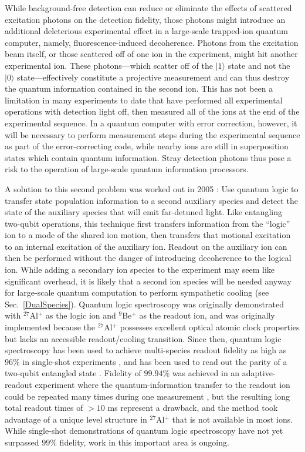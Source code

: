 \documentclass[%
reprint,
 amsmath,amssymb,
]{revtex4-1}
\newcommand{\zero}{|0 \rangle}
\newcommand{\one}{|1 \rangle}
\begin{document}
While background-free detection can reduce or eliminate the effects of scattered excitation photons on the detection fidelity, those photons might introduce an additional deleterious experimental effect in a large-scale trapped-ion quantum computer, namely, fluorescence-induced decoherence. Photons from the excitation beam itself, or those scattered off of one ion in the experiment, might hit another experimental ion. These photons---which scatter off of the $\one$ state and not the $\zero$ state---effectively constitute a projective measurement and can thus destroy the quantum information contained in the second ion. This has not been a limitation in many experiments to date that have performed all experimental operations with detection light off, then measured all of the ions at the end of the experimental sequence. In a quantum computer with error correction, however, it will be necessary to perform measurement steps during the experimental sequence as part of the error-correcting code, while nearby ions are still in superposition states which contain quantum information. Stray detection photons thus pose a risk to the operation of large-scale quantum information processors.

A solution to this second problem was worked out in 2005 \cite{SchmidtQuantumLogicSpectroscopy}: Use quantum logic to transfer state population information to a second auxiliary species and detect the state of the auxiliary species that will emit far-detuned light. Like entangling two-qubit operations, this technique first transfers information from the ``logic'' ion to a mode of the shared ion motion, then transfers that motional excitation to an internal excitation of the auxiliary ion. Readout on the auxiliary ion can then be performed without the danger of introducing decoherence to the logical ion. While adding a secondary ion species to the experiment may seem like significant overhead, it is likely that a second ion species will be needed anyway for large-scale quantum computation to perform sympathetic cooling (see Sec.~\ref{DualSpecies}). Quantum logic spectroscopy was originally demonstrated with $^{27}$Al$^+$ as the logic ion and $^9$Be$^+$ as the readout ion, and was originally implemented because the $^{27}$Al$^+$ possesses excellent optical atomic clock properties but lacks an accessible readout/cooling transition. Since then, quantum logic spectroscopy has been used to achieve multi-species readout fidelity as high as $96 \%$ in single-shot experiments \cite{BruzewiczQLAR2017}, and has been used to read out the parity of a two-qubit entangled state \cite{NegnevitskyMultiReadout2018}. Fidelity of $99.94 \%$ was achieved in an adaptive-readout experiment where the quantum-information transfer to the readout ion could be repeated many times during one measurement \cite{HumeAdaptiveDetection2007}, but the resulting long total readout times of $> 10$ ms represent a drawback, and the method took advantage of a unique level structure in $^{27}$Al$^+$ that is not available in most ions. While single-shot demonstrations of quantum logic spectroscopy have not yet surpassed $99\%$ fidelity, work in this important area is ongoing.
\end{document}
